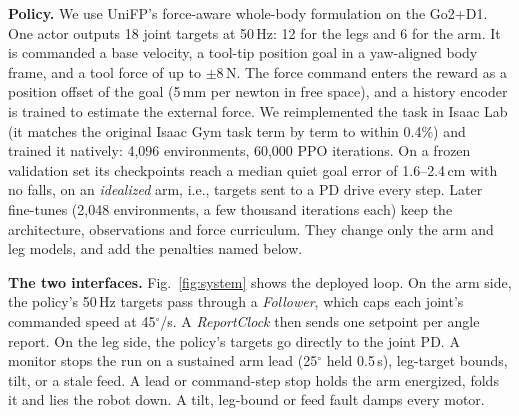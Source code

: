 \documentclass[conference]{IEEEtran}
\begin{document}
\textbf{Policy.} We use UniFP's force-aware whole-body formulation \citep{zhi2025unified} on the Go2+D1. One actor outputs 18 joint
targets at 50\,Hz: 12 for the legs and 6 for the arm. It is commanded a base velocity, a tool-tip position goal in a
yaw-aligned body frame, and a tool force of up to $\pm$8\,N. The force command enters the reward as a position offset of the
goal (5\,mm per newton in free space), and a history encoder is trained to estimate the external force. We
reimplemented the task in Isaac Lab (it matches the original Isaac Gym task term by term to within 0.4\%) and trained it
natively: 4,096 environments, 60,000 PPO \citep{schulman2017proximal} iterations. On a frozen validation set its
checkpoints reach a median quiet goal error of 1.6--2.4\,cm with no falls, on an \emph{idealized} arm, i.e., targets
sent to a PD drive every step. Later fine-tunes (2,048 environments, a few thousand iterations each) keep the architecture, observations and force
curriculum. They change only the arm and leg models, and add the penalties named below.

\textbf{The two interfaces.} Fig.~\ref{fig:system} shows the deployed loop. On the arm side, the policy's 50\,Hz targets
pass through a \emph{Follower}, which caps each joint's commanded speed at 45$^\circ$/s. A \emph{ReportClock} then sends one setpoint per angle report. On the leg side, the policy's targets go directly to
the joint PD. A monitor stops the run on a sustained arm lead (25$^\circ$ held 0.5\,s), leg-target bounds, tilt, or a
stale feed. A lead or command-step stop holds the arm energized, folds it and lies the robot down. A tilt, leg-bound or
feed fault damps every motor.
\end{document}
